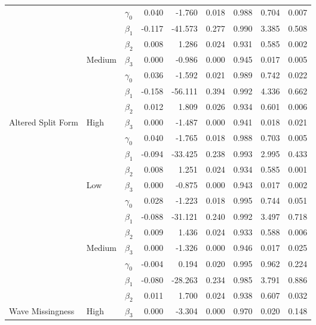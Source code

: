 \documentclass{article}\usepackage[]{graphicx}\usepackage[]{color}
\newenvironment{knitrout}{}{} %
\begin{document}
\begin{knitrout}
\begin{table}[H]
{\begin{tabular}[t]{l|l|l|r|r|r|r|r|r}
\cline{2-9}
 &  & $\gamma_0$ & 0.040 & -1.760 & 0.018 & 0.988 & 0.704 & 0.007\\
\cline{3-9}
 &  & $\beta_1$ & -0.117 & -41.573 & 0.277 & 0.990 & 3.385 & 0.508\\
\cline{3-9}
 &  & $\beta_2$ & 0.008 & 1.286 & 0.024 & 0.931 & 0.585 & 0.002\\
\cline{3-9}
 & \multirow{-4}{*}{\raggedright\arraybackslash Medium} & $\beta_3$ & 0.000 & -0.986 & 0.000 & 0.945 & 0.017 & 0.005\\
\cline{2-9}
 &  & $\gamma_0$ & 0.036 & -1.592 & 0.021 & 0.989 & 0.742 & 0.022\\
\cline{3-9}
 &  & $\beta_1$ & -0.158 & -56.111 & 0.394 & 0.992 & 4.336 & 0.662\\
\cline{3-9}
 &  & $\beta_2$ & 0.012 & 1.809 & 0.026 & 0.934 & 0.601 & 0.006\\
\cline{3-9}
\multirow{-12}{*}{\raggedright\arraybackslash Altered Split Form} & \multirow{-4}{*}{\raggedright\arraybackslash High} & $\beta_3$ & 0.000 & -1.487 & 0.000 & 0.941 & 0.018 & 0.021\\
\cline{1-9}
 &  & $\gamma_0$ & 0.040 & -1.765 & 0.018 & 0.988 & 0.703 & 0.005\\
\cline{3-9}
 &  & $\beta_1$ & -0.094 & -33.425 & 0.238 & 0.993 & 2.995 & 0.433\\
\cline{3-9}
 &  & $\beta_2$ & 0.008 & 1.251 & 0.024 & 0.934 & 0.585 & 0.001\\
\cline{3-9}
 & \multirow{-4}{*}{\raggedright\arraybackslash Low} & $\beta_3$ & 0.000 & -0.875 & 0.000 & 0.943 & 0.017 & 0.002\\
\cline{2-9}
 &  & $\gamma_0$ & 0.028 & -1.223 & 0.018 & 0.995 & 0.744 & 0.051\\
\cline{3-9}
 &  & $\beta_1$ & -0.088 & -31.121 & 0.240 & 0.992 & 3.497 & 0.718\\
\cline{3-9}
 &  & $\beta_2$ & 0.009 & 1.436 & 0.024 & 0.933 & 0.588 & 0.006\\
\cline{3-9}
 & \multirow{-4}{*}{\raggedright\arraybackslash Medium} & $\beta_3$ & 0.000 & -1.326 & 0.000 & 0.946 & 0.017 & 0.025\\
\cline{2-9}
 &  & $\gamma_0$ & -0.004 & 0.194 & 0.020 & 0.995 & 0.962 & 0.224\\
\cline{3-9}
 &  & $\beta_1$ & -0.080 & -28.263 & 0.234 & 0.985 & 3.791 & 0.886\\
\cline{3-9}
 &  & $\beta_2$ & 0.011 & 1.700 & 0.024 & 0.938 & 0.607 & 0.032\\
\cline{3-9}
\multirow{-12}{*}{\raggedright\arraybackslash Wave Missingness} & \multirow{-4}{*}{\raggedright\arraybackslash High} & $\beta_3$ & 0.000 & -3.304 & 0.000 & 0.970 & 0.020 & 0.148\\
\hline
\end{tabular}}
\end{table}


\end{knitrout}
\end{document}
